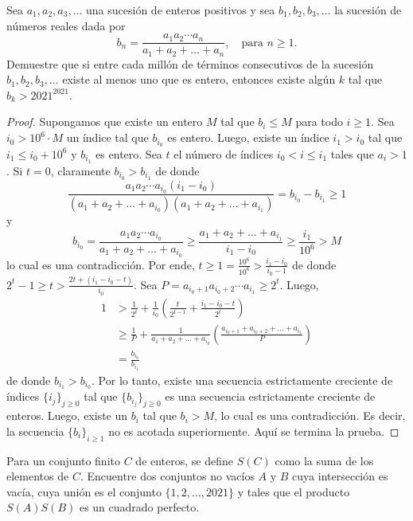 \begin{probMB}[IberoAmerican 2021/3]
  Sea $a_1,a_2,a_3,\dots$ una sucesión de enteros positivos y sea
  $b_1,b_2,b_3,\dots$ la sucesión de números reales dada por
  \[b_n=\frac{a_1a_2\cdots a_n}{a_1+a_2+\dots+a_n},\quad\text{para }n\ge 1.\]
  Demuestre que si entre cada millón de términos consecutivos de la sucesión
  $b_1,b_2,b_3,\dots$ existe al menos uno que es entero, entonces existe algún
  $k$ tal que $b_k>2021^{2021}$.
\end{probMB}

\begin{proof}
  Supongamos que existe un entero $M$ tal que $b_i\le M$ para todo $i\ge 1$. Sea
  $i_0>10^6\cdot M$ un índice tal que $b_{i_0}$ es entero. Luego, existe un
  índice $i_1>i_0$ tal que $i_1\le i_0+10^6$ y $b_{i_1}$ es entero. Sea $t$ el
  número de índices $i_0<i\le i_1$ tales que $a_i>1$. Si $t=0$, claramente
  $b_{i_0}>b_{i_1}$ de donde
  \[
    \frac{a_1a_2\cdots a_{i_0}(i_1-i_0)}{(a_1+a_2+\dots+a_{i_0})(a_1+a_2+\dots+a_{i_1})}
    =b_{i_0}-b_{i_1}
    \ge 1
  \]
  y
  \[
    b_{i_0}
    =\frac{a_1a_2\cdots a_{i_0}}{a_1+a_2+\dots+a_{i_0}}
    \ge\frac{a_1+a_2+\dots+a_{i_1}}{i_1-i_0}
    \ge\frac{i_1}{10^6}
    >M
  \]
  lo cual es una contradicción. Por ende,
  $t\ge 1=\frac{10^6}{10^6}>\frac{i_1-i_0}{i_0-1}$ de donde
  $2^t-1\ge t>\frac{2t+(i_1-i_0-t)}{i_0}$. Sea
  $P=a_{i_0+1}a_{i_0+2}\cdots a_{i_1}\ge 2^t$. Luego,
  \begin{align*}
    1
    &> \frac{1}{2^t}+\frac{1}{i_0}\left(\frac{t}{2^{t-1}}+\frac{i_1-i_0-t}{2^t}\right) \\
    &\ge \frac{1}{P}+\frac{1}{a_1+a_2+\dots+a_{i_0}}\left(\frac{a_{i_0+1}+a_{i_0+2}+\dots+a_{i_1}}{P}\right) \\
    &= \frac{b_{i_0}}{b_{i_1}}
  \end{align*}
  de donde $b_{i_1}>b_{i_0}$. Por lo tanto, existe una secuencia estrictamente
  creciente de índices $\{i_j\}_{j\ge 0}$ tal que $\{b_{i_j}\}_{j\ge 0}$ es una
  secuencia estrictamente creciente de enteros. Luego, existe un $b_i$ tal que
  $b_i>M$, lo cual es una contradicción. Es decir, la secuencia
  $\{b_i\}_{i\ge 1}$ no es acotada superiormente. Aquí se termina la prueba.
\end{proof}

\begin{probEB}[IberoAmerican 2021/5]
  Para un conjunto finito $C$ de enteros, se define $S(C)$ como la suma de los
  elementos de $C$. Encuentre dos conjuntos no vacíos $A$ y $B$ cuya
  intersección es vacía, cuya unión es el conjunto $\{1,2,\dots,2021\}$ y tales
  que el producto $S(A)S(B)$ es un cuadrado perfecto.
\end{probEB}

